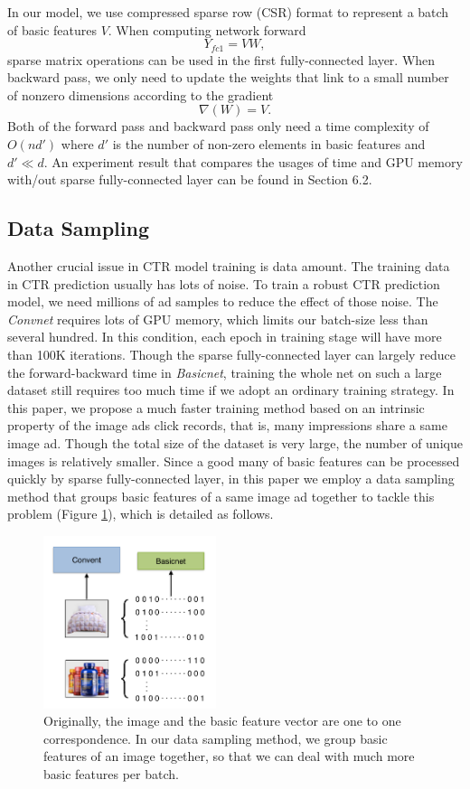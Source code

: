 \documentclass{sig-alternate}
\begin{document}
In our model, we use compressed sparse row (CSR) format to represent a batch of basic features $V$. When computing network forward 
\begin{equation}
Y_{fc1} = VW,
\end{equation}
sparse matrix operations  can be used in the first fully-connected layer. When backward pass,  we only need to update the weights that link to a small number of nonzero dimensions according to the gradient
\begin{equation}
\nabla(W) = V.
\end{equation}
Both of the forward pass and backward pass only need a time complexity of $O(nd')$ where $d'$ is the number of  non-zero elements in basic features and $d' \ll d$. An experiment result that compares the usages of time and GPU memory with/out sparse fully-connected layer can be found in Section 6.2.
\subsection{Data Sampling}
Another crucial issue in CTR model training is data amount. The training data in CTR prediction usually has lots of noise. To train a robust CTR prediction model, we need  millions of ad samples to reduce the effect of those noise. The \emph{Convnet} requires lots of GPU memory, which limits our batch-size less than several hundred. In this condition, each epoch in training stage will have more than 100K iterations.  Though the sparse fully-connected layer can largely reduce the forward-backward time in \emph{Basicnet}, training the whole net on such a large dataset still requires too much time if we adopt an ordinary training strategy. In this paper, we propose a much faster training method based on an intrinsic property of the image ads click records, that is, many impressions share a same image ad. Though the total size of the dataset is very large, the number of unique images is relatively smaller. Since a good many of basic features can be processed quickly by sparse fully-connected layer, in this paper we employ a data sampling method that groups basic features of a same image ad together to tackle this problem (Figure \ref{fig:sampling}), which is detailed as follows.
\begin{figure}
	\centering
	\includegraphics[width=0.45\textwidth]{sampling}
	\caption{Originally, the image and the basic feature vector are one to one correspondence. In our data sampling method, we group basic features of an image together, so that we can deal with much more basic features per batch. }
	\label{fig:sampling}
\end{figure}
\end{document}
